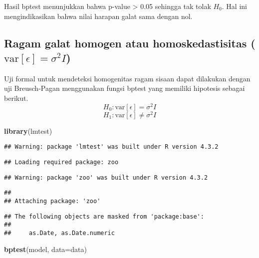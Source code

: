 \documentclass[
]{article}
\newenvironment{Shaded}{\begin{snugshade}}{\end{snugshade}}
\newcommand{\AttributeTok}[1]{\textcolor[rgb]{0.13,0.29,0.53}{#1}}
\newcommand{\FunctionTok}[1]{\textcolor[rgb]{0.13,0.29,0.53}{\textbf{#1}}}
\newcommand{\NormalTok}[1]{#1}
\begin{document}
Hasil bptest menunjukkan bahwa p-value \textgreater{} 0.05 sehingga tak
tolak \(H_0\). Hal ini mengindikasikan bahwa nilai harapan galat sama
dengan nol.

\hypertarget{ragam-galat-homogen-atau-homoskedastisitas-textvarepsilon-sigma2-i}{%
\subsection{\texorpdfstring{Ragam galat homogen atau homoskedastisitas
(\(\text{var}[\epsilon] = \sigma^2 I\))}{Ragam galat homogen atau homoskedastisitas (\textbackslash text\{var\}{[}\textbackslash epsilon{]} = \textbackslash sigma\^{}2 I)}}\label{ragam-galat-homogen-atau-homoskedastisitas-textvarepsilon-sigma2-i}}

Uji formal untuk mendeteksi homogenitas ragam sisaan dapat dilakukan
dengan uji Breusch-Pagan menggunakan fungsi bptest yang memiliki
hipotesis sebagai berikut. \[H_0: \text{var}[\epsilon] = \sigma^2 I\]
\[H_1: \text{var}[\epsilon] \neq \sigma^2 I\]

\begin{Shaded}
\begin{Highlighting}[]
\FunctionTok{library}\NormalTok{(lmtest)}
\end{Highlighting}
\end{Shaded}

\begin{verbatim}
## Warning: package 'lmtest' was built under R version 4.3.2
\end{verbatim}

\begin{verbatim}
## Loading required package: zoo
\end{verbatim}

\begin{verbatim}
## Warning: package 'zoo' was built under R version 4.3.2
\end{verbatim}

\begin{verbatim}
## 
## Attaching package: 'zoo'
\end{verbatim}

\begin{verbatim}
## The following objects are masked from 'package:base':
## 
##     as.Date, as.Date.numeric
\end{verbatim}

\begin{Shaded}
\begin{Highlighting}[]
\FunctionTok{bptest}\NormalTok{(model, }\AttributeTok{data=}\NormalTok{data)}
\end{Highlighting}
\end{Shaded}
\end{document}
